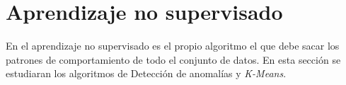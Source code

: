 \clearpage




\section{Aprendizaje no supervisado}
En el aprendizaje no supervisado es el propio algoritmo el que debe sacar los patrones de 
comportamiento de todo el conjunto de datos.
En esta sección se estudiaran los algoritmos de Detección de anomalías y \textit{K-Means}.

